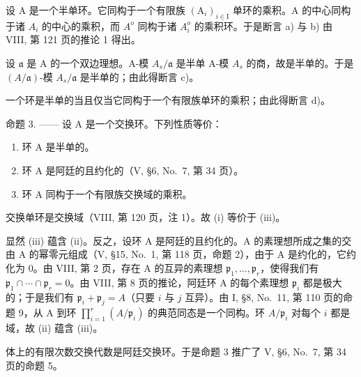 设 A 是一个半单环。它同构于一个有限族 \((\mathrm{A}_{i})_{i\in\mathrm{I}}\) 单环的乘积。A 的中心同构于诸 \(A_{i}\) 的中心的乘积，而 \(A^{o}\) 同构于诸 \(A_{i}^{o}\) 的乘积环。于是断言 a) 与 b) 由 VIII, 第 121 页的推论 1 得出。

设 \(\mathfrak{a}\) 是 A 的一个双边理想。A-模 \(A_s / \mathfrak{a}\) 是半单 A-模 \(A_s\) 的商，故是半单的。于是 \((A / \mathfrak{a})\)-模 \(A_s / \mathfrak{a}\) 是半单的；由此得断言 c)。

一个环是半单的当且仅当它同构于一个有限族单环的乘积；由此得断言 d)。

命题 3. —— 设 A 是一个交换环。下列性质等价：

\begin{enumerate}
\def\labelenumi{(\roman{enumi})}
\item
  环 A 是半单的。
\item
  环 A 是阿廷的且约化的（V, §6, No.~7, 第 34 页）。
\item
  环 A 同构于一个有限族交换域的乘积。
\end{enumerate}

交换单环是交换域（VIII, 第 120 页，注 1）。故 (i) 等价于 (iii)。

显然 (iii) 蕴含 (ii)。反之，设环 A 是阿廷的且约化的。A 的素理想所成之集的交由 A 的幂零元组成（V, §15, No.~1, 第 118 页，命题 2），由于 A 是约化的，它约化为 0。由 VIII, 第 2 页，存在 A 的互异的素理想 \(\mathfrak{p}_1, \ldots, \mathfrak{p}_r\)，使得我们有 \(\mathfrak{p}_1 \cap \cdots \cap \mathfrak{p}_r = 0\)。由 VIII, 第 8 页的推论，阿廷环 A 的每个素理想 \(\mathfrak{p}_i\) 都是极大的；于是我们有 \(\mathfrak{p}_i + \mathfrak{p}_j = A\)（只要 \(i\) 与 \(j\) 互异）。由 I, §8, No.~11, 第 110 页的命题 9，从 A 到环 \(\prod_{i=1}^{r} (A / \mathfrak{p}_i)\) 的典范同态是一个同构。环 \(A / \mathfrak{p}_i\) 对每个 \(i\) 都是域，故 (ii) 蕴含 (iii)。

体上的有限次数交换代数是阿廷交换环。于是命题 3 推广了 V, §6, No.~7, 第 34 页的命题 5。

